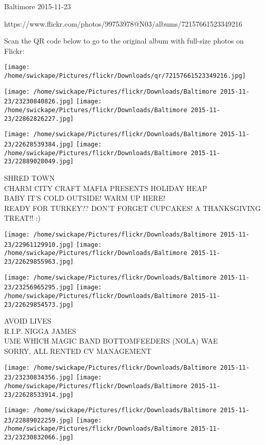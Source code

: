 \documentclass[10pt,letterpaper]{article}
\begin{document}
Baltimore 2015-11-23

https://www.flickr.com/photos/99753978@N03/albums/72157661523349216

Scan the QR code below to go to the original album with full-size photos on Flickr:

\texttt{[image: /home/swickape/Pictures/flickr/Downloads/qr/72157661523349216.jpg]}
\pagebreak

\texttt{[image: /home/swickape/Pictures/flickr/Downloads/Baltimore 2015-11-23/23230840826.jpg]}
\texttt{[image: /home/swickape/Pictures/flickr/Downloads/Baltimore 2015-11-23/22862826227.jpg]}

\texttt{[image: /home/swickape/Pictures/flickr/Downloads/Baltimore 2015-11-23/22628539384.jpg]}
\texttt{[image: /home/swickape/Pictures/flickr/Downloads/Baltimore 2015-11-23/22889028049.jpg]}

SHRED TOWN\\
CHARM CITY CRAFT MAFIA PRESENTS HOLIDAY HEAP\\
BABY IT'S COLD OUTSIDE!  WARM UP HERE!\\
READY FOR TURKEY??  DON'T FORGET CUPCAKES!  A THANKSGIVING TREAT!! :)\\
\pagebreak

\texttt{[image: /home/swickape/Pictures/flickr/Downloads/Baltimore 2015-11-23/22961129910.jpg]}
\texttt{[image: /home/swickape/Pictures/flickr/Downloads/Baltimore 2015-11-23/22629855963.jpg]}

\texttt{[image: /home/swickape/Pictures/flickr/Downloads/Baltimore 2015-11-23/23256965295.jpg]}
\texttt{[image: /home/swickape/Pictures/flickr/Downloads/Baltimore 2015-11-23/22629854573.jpg]}

AVOID LIVES\\
R.I.P. NIGGA JAMES\\
UME WHICH MAGIC BAND BOTTOMFEEDERS (NOLA) WAE\\
SORRY, ALL RENTED CV MANAGEMENT\\
\pagebreak

\texttt{[image: /home/swickape/Pictures/flickr/Downloads/Baltimore 2015-11-23/23230834356.jpg]}
\texttt{[image: /home/swickape/Pictures/flickr/Downloads/Baltimore 2015-11-23/22628533914.jpg]}

\texttt{[image: /home/swickape/Pictures/flickr/Downloads/Baltimore 2015-11-23/22889022259.jpg]}
\texttt{[image: /home/swickape/Pictures/flickr/Downloads/Baltimore 2015-11-23/23230832066.jpg]}
\end{document}
